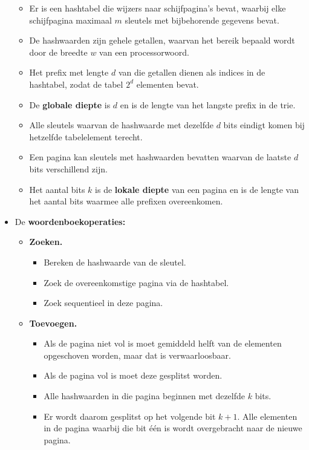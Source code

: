 \begin{itemize}
\begin{itemize}
        \item Er is een hashtabel die wijzers naar schijfpagina's bevat, waarbij elke schijfpagina maximaal $m$ sleutels met bijbehorende gegevens bevat.
        \item De hashwaarden zijn gehele getallen, waarvan het bereik bepaald wordt door de breedte $w$ van een processorwoord.
        \item Het prefix met lengte $d$ van die getallen dienen als indices in de hashtabel, zodat de tabel $2^d$ elementen bevat.
        \item De \textbf{globale diepte} is $d$ en is de lengte van het langste prefix in de trie.
        \item Alle sleutels waarvan de hashwaarde met dezelfde $d$ bits eindigt komen bij hetzelfde tabelelement terecht.
        \item Een pagina kan sleutels met hashwaarden bevatten waarvan de laatste $d$ bits verschillend zijn.
        \item Het aantal bits $k$ is de \textbf{lokale diepte} van een pagina en is de lengte van het aantal bits waarmee alle prefixen overeenkomen.
    \end{itemize}
    \item De \textbf{woordenboekoperaties:}
    \begin{itemize}
        \item \textbf{Zoeken.}
        \begin{itemize}
            \item Bereken de hashwaarde van de sleutel.
            \item Zoek de overeenkomstige pagina via de hashtabel.
            \item Zoek sequentieel in deze pagina.
        \end{itemize}
        \item \textbf{Toevoegen.}
        \begin{itemize}
            \item Als de pagina niet vol is moet gemiddeld helft van de elementen opgeschoven worden, maar dat is verwaarloosbaar.
            \item Als de pagina vol is moet deze gesplitst worden.
            \item Alle hashwaarden in die pagina beginnen met dezelfde $k$ bits.
            \item Er wordt daarom gesplitst op het volgende bit $k + 1$. Alle elementen in de pagina waarbij die bit één is wordt overgebracht naar de nieuwe pagina.

\end{itemize}
\end{itemize}
\end{itemize}
